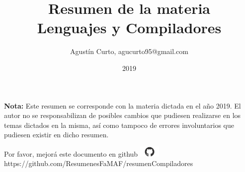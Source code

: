 \documentclass[12pt,a4paper]{article}
\author{Agustín Curto, agucurto95@gmail.com}
\title{Resumen de la materia \\Lenguajes y Compiladores}
\date{2019}
\begin{document}
	\clearpage\maketitle
	\thispagestyle{empty}
	\tableofcontents

	\vspace{5cm}
	\PN \textbf{Nota:} Este resumen se corresponde con la materia dictada en el año 2019. El autor no se
	responsabilizan de posibles cambios que pudiesen realizarse en los temas dictados en la misma, así como tampoco de
	errores involuntarios que pudiesen existir en dicho resumen.

	\vspace{\fill}
	\begin{center}
		Por favor, mejorá este documento en github
		\includegraphics[width=1cm]{graphics/github.png} \\
		https://github.com/ResumenesFaMAF/resumenCompiladores
	\end{center}

	\pagebreak

	
	
	
	
	
	
\end{document}
